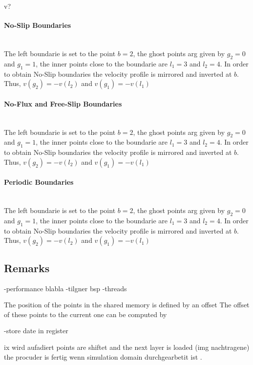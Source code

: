 v?

\paragraph{No-Slip Boundaries}\mbox{}\\

The left boundarie is set to the point $b=2$,
the ghost points arg given by $g_2=0$ and $g_1=1$, the inner points close
to the boundarie are $l_1=3$ and $l_2=4$.
In order to obtain No-Slip boundaries the velocity profile is mirrored and inverted
at $b$. Thus, $v(g_2) = -v(l_2)$ and  $v(g_1) = -v(l_1)$



\paragraph{No-Flux and Free-Slip Boundaries}\mbox{}\\

The left boundarie is set to the point $b=2$,
the ghost points arg given by $g_2=0$ and $g_1=1$, the inner points close
to the boundarie are $l_1=3$ and $l_2=4$.
In order to obtain No-Slip boundaries the velocity profile is mirrored and inverted
at $b$. Thus, $v(g_2) = -v(l_2)$ and  $v(g_1) = -v(l_1)$


\paragraph{Periodic Boundaries}\mbox{}\\

The left boundarie is set to the point $b=2$,
the ghost points arg given by $g_2=0$ and $g_1=1$, the inner points close
to the boundarie are $l_1=3$ and $l_2=4$.
In order to obtain No-Slip boundaries the velocity profile is mirrored and inverted
at $b$. Thus, $v(g_2) = -v(l_2)$ and  $v(g_1) = -v(l_1)$

\subsection{Remarks}

-performance blabla
-tilgner bsp
-threads

The position of the points in the shared memory is defined by an offset
The offset of these points to the current one can be computed by

-store date in register

ix wird aufadiert points are shiftet  and the next layer is loaded (img nachtragene)
the procuder is fertig wenn simulation domain  durchgearbetit ist .

